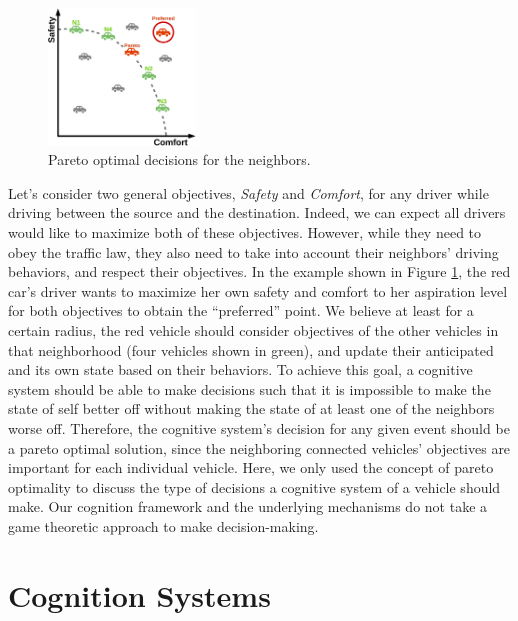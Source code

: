 \documentclass[journal, 11pt]{IEEEtran}
\begin{document}
\begin{figure}[!t]
  \centering
  \includegraphics[width=0.35\textwidth]{figs/pareto-croped.pdf}
  \vspace*{-2mm}
  \caption{{\fontsize{10}{10}\selectfont Pareto optimal decisions for the
  neighbors.}}
  \label{fig:pareto}
  \vspace*{-6mm}
\end{figure}

Let's consider two general objectives, \textit{Safety} and \textit{Comfort}, for
any driver while driving between the source and the destination. Indeed, we can
expect all drivers would like to maximize both of these objectives. However,
while they need to obey the traffic law, they also need to take into account
their neighbors' driving behaviors, and respect their objectives. In the example
shown in Figure \ref{fig:pareto}, the red car's driver wants to maximize her own
safety and comfort to her aspiration level for both objectives to obtain the
``preferred'' point. We believe at least for a certain radius, the red vehicle
should consider objectives of the other vehicles in that neighborhood (four
vehicles shown in green), and update their anticipated and its own state based
on their behaviors. To achieve this goal, a cognitive system should be able to
make decisions such that it is impossible to make the state of self better
off without making the state of at least one of the neighbors worse off.
Therefore, the cognitive system's decision for any given event should be a
pareto optimal solution, since the neighboring connected vehicles' objectives
are important for each individual vehicle. Here, we only used the concept of
pareto optimality to discuss the type of decisions a cognitive system of a
vehicle should make. Our cognition framework and the underlying mechanisms do
not take a game theoretic approach to make decision-making.

\section{Cognition Systems}
\end{document}
